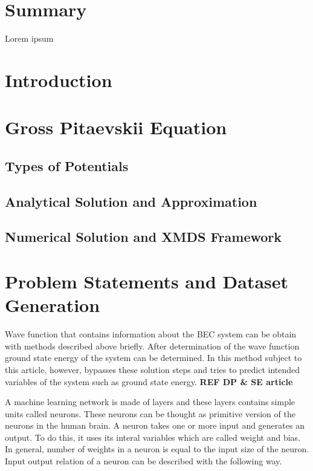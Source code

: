 \documentclass[a4paper,times,12pt]{article}
\title{}%
\date{}
\begin{document}
\setcounter{page}{1}

\section*{Summary}
Lorem ipsum
\section{Introduction}
\section{Gross Pitaevskii Equation}





\subsection{Types of Potentials}
\subsection{Analytical Solution and Approximation}
\subsection{Numerical Solution and XMDS Framework}
\section{Problem Statements and Dataset Generation}

Wave function that contains information about the BEC system can be obtain with methods described above briefly. After determination of the wave function ground state energy of the system can be determined. In this method subject to this article, however, bypasses these solution steps and tries to predict intended variables of the system such as ground state energy. \textbf{REF DP \& SE article}

A machine learning network is made of layers and these layers contains simple units called neurons. These neurons can be thought as primitive version of the neurons in the human brain. A neuron takes one or more input and generates an output. To do this, it uses its interal variables which are called weight and bias. In general, number of weights in a neuron is equal to the input size of the neuron. Input output relation of a neuron can be described with the following way. 
\end{document}
